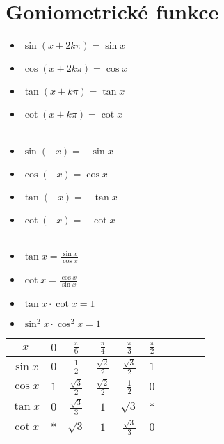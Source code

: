 \documentclass{article}
\begin{document}
	\section*{Goniometrické funkce}
	\begin{multicols}{4}
		\begin{itemize}
			\item $\sin{(x \pm 2k\pi)} = \sin{x}$
			\item $\cos{(x \pm 2k\pi)} = \cos{x}$
			\item $\tan{(x \pm k\pi)} = \tan{x}$
			\item $\cot{(x \pm k\pi)} = \cot{x}$
			\\\\
		\columnbreak
			\item $\sin{(-x)} = -\sin{x}$
			\item $\cos{(-x)} = \cos{x}$
			\item $\tan{(-x)} = -\tan{x}$
			\item $\cot{(-x)} = -\cot{x}$
			\\\\
		\columnbreak
			\item $\tan{x} = \frac{\sin{x}}{\cos{x}}$
			\item $\cot{x} = \frac{\cos{x}}{\sin{x}}$
			\item $\tan{x} \cdot \cot{x} = 1$
			\item $\sin^{2}{x} \cdot \cos^{2}{x} = 1$
			\\
		\end{itemize}
		\columnbreak
		\begingroup
			\centering
			\renewcommand{\arraystretch}{1.55}
			\begin{tabular}{|c|c|c|c|c|c|c|c|c|c|}\hline
				$x$				&	$0$	&	$\frac{\pi}{6}$				&	$\frac{\pi}{4}$				&	$\frac{\pi}{3}$				&	$\frac{\pi}{2}$	\\\hline
				$\sin{x}$	&	$0$	&	$\frac{1}{2}$					&	$\frac{\sqrt{2}}{2}$	&	$\frac{\sqrt{3}}{2}$	&	$1$							\\\hline
				$\cos{x}$	&	$1$	&	$\frac{\sqrt{3}}{2}$	&	$\frac{\sqrt{2}}{2}$	&	$\frac{1}{2}$					&	$0$							\\\hline
				$\tan{x}$	&	$0$	&	$\frac{\sqrt{3}}{3}$	&	$1$										&	$\sqrt{3}$						&	$*$							\\\hline
				$\cot{x}$	&	$*$	&	$\sqrt{3}$						&	$1$										&	$\frac{\sqrt{3}}{3}$	&	$0$							\\\hline
			\end{tabular}
		\endgroup
	\end{multicols}
\end{document}
